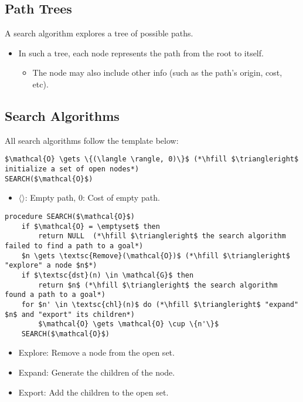 \subsection{Path Trees}
\begin{definition}
    A search algorithm explores a tree of possible paths. 
    \begin{itemize}
        \item In such a tree, each node represents the path from the root to itself.
        \begin{itemize}
            \item The node may also include other info (such as the path's origin, cost, etc).
        \end{itemize}
    \end{itemize}
\end{definition}

\subsection{Search Algorithms}
\begin{algo}
    All search algorithms follow the template below:

\begin{lstlisting}
$\mathcal{O} \gets \{(\langle \rangle, 0)\}$ (*\hfill $\triangleright$ initialize a set of open nodes*) 
SEARCH($\mathcal{O}$)
\end{lstlisting}
\begin{itemize}
    \item $\langle \rangle$: Empty path, $0$: Cost of empty path.
\end{itemize}

\begin{lstlisting}
procedure SEARCH($\mathcal{O}$)
    if $\mathcal{O} = \emptyset$ then
        return NULL  (*\hfill $\triangleright$ the search algorithm failed to find a path to a goal*)
    $n \gets \textsc{Remove}(\mathcal{O})$ (*\hfill $\triangleright$ "explore" a node $n$*)
    if $\textsc{dst}(n) \in \mathcal{G}$ then
        return $n$ (*\hfill $\triangleright$ the search algorithm found a path to a goal*)
    for $n' \in \textsc{chl}(n)$ do (*\hfill $\triangleright$ "expand" $n$ and "export" its children*)
        $\mathcal{O} \gets \mathcal{O} \cup \{n'\}$ 
    SEARCH($\mathcal{O}$)
\end{lstlisting}
\begin{itemize}
    \item Explore: Remove a node from the open set.
    \item Expand: Generate the children of the node.
    \item Export: Add the children to the open set.
\end{itemize}

\end{algo}

